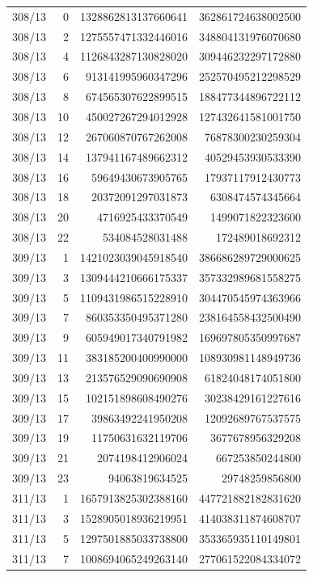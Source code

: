 \begin{longtable}{@{}rrrr@{}}
308/13 & 0 & 1328862813137660641 & 362861724638002500\\
308/13 & 2 & 1275557471332446016 & 348804131976070680\\
308/13 & 4 & 1126843287130828020 & 309446232297172880\\
308/13 & 6 & 913141995960347296 & 252570495212298529\\
308/13 & 8 & 674565307622899515 & 188477344896722112\\
308/13 & 10 & 450027267294012928 & 127432641581001750\\
308/13 & 12 & 267060870767262008 & 76878300230259304\\
308/13 & 14 & 137941167489662312 & 40529453930533390\\
308/13 & 16 & 59649430673905765 & 17937117912430773\\
308/13 & 18 & 20372091297031873 & 6308474574345664\\
308/13 & 20 & 4716925433370549 & 1499071822323600\\
308/13 & 22 & 534084528031488 & 172489018692312\\
309/13 & 1 & 1421023039045918540 & 386686289729000625\\
309/13 & 3 & 1309444210666175337 & 357332989681558275\\
309/13 & 5 & 1109431986515228910 & 304470545974363966\\
309/13 & 7 & 860353350495371280 & 238164558432500490\\
309/13 & 9 & 605949017340791982 & 169697805350997687\\
309/13 & 11 & 383185200400990000 & 108930981148949736\\
309/13 & 13 & 213576529090690908 & 61824048174051800\\
309/13 & 15 & 102151898608490276 & 30238429161227616\\
309/13 & 17 & 39863492241950208 & 12092689767537575\\
309/13 & 19 & 11750631632119706 & 3677678956329208\\
309/13 & 21 & 2074198412906024 & 667253850244800\\
309/13 & 23 & 94063819634525 & 29748259856800\\
311/13 & 1 & 1657913825302388160 & 447721882182831620\\
311/13 & 3 & 1528905018936219951 & 414038311874608707\\
311/13 & 5 & 1297501885033738800 & 353365935110149801\\
311/13 & 7 & 1008694065249263140 & 277061522084334072\\

\end{longtable}
